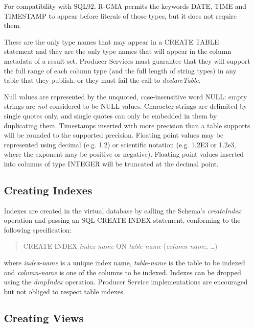 For compatibility with SQL92, R-GMA permits the keywords DATE, TIME and
TIMESTAMP to appear before literals of those types, but it does not require
them.

These are the only type names that may appear in a CREATE TABLE statement and
they are the only type names that will appear in the column metadata of a
result set. Producer Services must guarantee that they will support the full
range of each column type (and the full length of string types) in any table
that they publish, or they must fail the call to \textit{declareTable}.

Null values are represented by the unquoted, case-insensitive word
NULL: empty strings are \textit{not} considered to be NULL
values.  Character strings are delimited by single quotes only, and
single quotes can only be embedded in them by duplicating them.
Timestamps inserted with more precision than a table supports will be
rounded to the supported precision. Floating point values may be
represented using decimal (e.g. 1.2) or scientific notation
(e.g. 1.2E3 or 1.2e3, where the exponent may be positive or negative).
Floating point values inserted into columns of type INTEGER will be 
truncated at the decimal point.

\subsection{Creating Indexes}\label{sec:SQLCreateIndex}

Indexes are created in the virtual database by calling the Schema's
\textit{createIndex} operation and passing an SQL CREATE INDEX
statement, conforming to the following specification:

\begin{quote}
CREATE INDEX \textit{index-name} ON \textit{table-name}
(\textit{column-name}, \ldots)
\end{quote}

where \textit{index-name} is a unique index name, \textit{table-name}
is the table to be indexed and \textit{column-name} is one of the
columns to be indexed. Indexes can be dropped using the
\textit{dropIndex} operation. Producer Service implementations are encouraged
but not obliged to respect table indexes.

\subsection{Creating Views}\label{sec:SQLCreateView}

